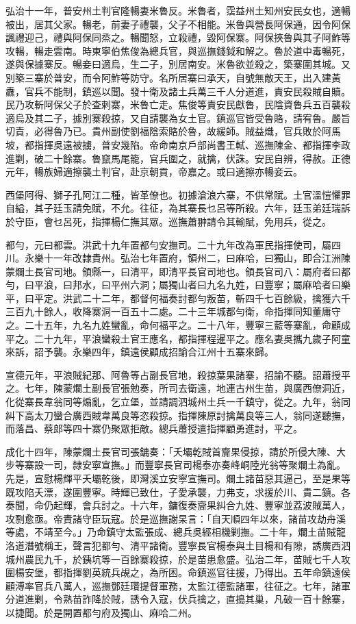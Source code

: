 \begin{pinyinscope}
弘治十一年，普安州土判官隆暢妻米魯反。米魯者，霑益州土知州安民女也，適暢被出，居其父家。暢老，前妻子禮襲，父子不相能。米魯與營長阿保通，因令阿保諷禮迎己，禮與阿保同烝之。暢聞怒，立殺禮，毀阿保寨。阿保挾魯與其子阿鮓等攻暢，暢走雲南。時東寧伯焦俊為總兵官，與巡撫錢鉞和解之。魯於道中毒暢死，遂與保據寨反。暢妾曰適烏，生二子，別居南安。米魯欲並殺之，築寨圍其城。又別築三寨於普安，而令阿鮓等防守。名所居寨曰承天，自號無敵天王，出入建黃纛，官兵不能制，鎮巡以聞。發十衛及諸土兵萬三千人分道進，責安民殺賊自贖。民乃攻斬阿保父子於查剌寨，米魯亡走。焦俊等責安民獻魯，民陰資魯兵五百襲殺適烏及其二子，據別寨殺掠，又自請襲為女土官。鎮巡官皆受魯賂，請宥魯。嚴旨切責，必得魯乃已。貴州副使劉福陰索賂於魯，故緩師。賊益熾，官兵敗於阿馬坡，都指揮吳遠被擄，普安幾陷。帝命南京戶部尚書王軾、巡撫陳金、都指揮李政進剿，破二十餘寨。魯竄馬尾籠，官兵圍之，就擒，伏誅。安民自辨，得赦。正德元年，暢族婦適擦襲土判官，赴京朝貢，帝嘉之。或曰適擦亦暢妾云。

西堡阿得、獅子孔阿江二種，皆革僚也。初據滄浪六寨，不供常賦。土官溫愷懼罪自縊，其子廷玉請免賦，不允。往征，為其寨長乜呂等所殺。六年，廷玉弟廷瑞訴於守臣，會乜呂死，指揮楊仁撫其眾。巡撫蕭翀請令其輸賦，免用兵，從之。

都勻，元曰都雲。洪武十九年置都勻安撫司。二十九年改為軍民指揮使司，屬四川。永樂十一年改隸貴州。弘治七年置府，領州二，曰麻哈，曰獨山，即合江洲陳蒙爛土長官司地。領縣一，曰清平，即清平長官司地也。領長官司八：屬府者曰都勻，曰平浪，曰邦水，曰平州六洞；屬獨山者曰九名九姓，曰豐寧；屬麻哈者曰樂平，曰平定。洪武二十二年，都督何福奏討都勻叛苗，斬四千七百餘級，擒獲六千三百九十餘人，收降寨洞一百五十二處。二十三年城都勻衛，命指揮同知董庸守之。二十五年，九名九姓蠻亂，命何福平之。二十八年，豐寧三藍等寨亂，命顧成平之。二十九年，平浪蠻殺土官王應名，都指揮程暹平之。應名妻吳攜九歲子阿童來訴，詔予襲。永樂四年，鎮遠侯顧成招諭合江州十五寨來歸。

宣德元年，平浪賊紀那、阿魯等占副長官地，殺掠葉果諸寨，招諭不聽。詔蕭授平之。七年，陳蒙爛土副長官張勉奏，所司去衛遠，地連古州生苗，與廣西僚洞近，化從寨長韋翁同等煽亂，乞立堡，並請調泗城州土兵一千鎮守，從之。九年，翁同糾下高太刀蠻合廣西賊韋萬良等恣殺掠。指揮陳原討擒萬良等三人，翁同遂聽撫，而落昌、蔡郎等四十寨仍聚眾拒敵。總兵蕭授遣指揮顧勇進討，平之。

成化十四年，陳蒙爛土長官司張鏞奏：「夭壩乾賊首齎果侵掠，請於所侵大陳、大步等寨設一司，隸安寧宣撫。」而豐寧長官司楊泰亦奏峰峒陸光翁等聚爛土為亂。先是，宣慰楊輝平夭壩乾後，即灣溪立安寧宣撫司。爛土諸苗惡其逼己，至是果等既攻陷夭漂，遂圍豐寧。時輝已致仕，子愛承襲，力弗支，求援於川、貴二鎮。各奏聞，命仍起輝，會兵討之。十六年，鏞復奏齎果糾合九姓、豐寧並荔波賊萬人，攻剽愈亟。帝責諸守臣玩寇。於是巡撫謝杲言：「自天順四年以來，諸苗攻劫舟溪等處，不靖至今。」乃命鎮守太監張成、總兵吳經相機剿撫。二十年，爛土苗賊龍洛道潛號稱王，聲言犯都勻、清平諸衛。豐寧長官楊泰與土目楊和有隙，誘廣西泗城州農民九千，於銕坑等一百餘寨殺掠，於是苗患愈盛。弘治二年，苗賊七千人攻圍楊安堡，都指揮劉英統兵覘之，為所困。命鎮巡官往援，乃得出。五年命鎮遠侯顧溥率官兵八萬人，巡撫鄧廷瓚提督軍務，太監江德監諸軍，往征之。七年，諸軍分道進剿，令熟苗詐降於賊，誘令入寇，伏兵擒之，直搗其巢，凡破一百十餘寨，以捷聞。於是開置都勻府及獨山、麻哈二州。


\end{pinyinscope}
